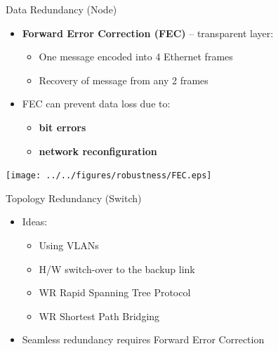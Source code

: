 \documentclass[compress,red]{beamer}
\begin{document}
\begin{frame}{Data Redundancy (Node)}
   
  \begin{itemize}
	\item {\bf Forward Error Correction (FEC)}  -- transparent layer:
	\begin{itemize}
		\item One message encoded into 4 Ethernet frames
		\item Recovery of message from any 2 frames
	\end{itemize}
	\item <2->FEC can prevent data loss due to:
	\begin{itemize}	
		\item<3-> {\bf bit errors} 
		\item<4> {\bf network reconfiguration}
	\end{itemize}	
  \end{itemize}
  
  	\begin{center}
      \texttt{[image: ../../figures/robustness/FEC.eps]}
    \end{center}
  
\end{frame}

\begin{frame}{Topology Redundancy (Switch)}

  \begin{itemize}
	\item Ideas:
	\begin{itemize}
        \item Using VLANs
        \item H/W switch-over to the backup link
	      \item WR Rapid Spanning Tree Protocol
	      \item WR Shortest Path Bridging
	\end{itemize}
	\item Seamless redundancy requires Forward Error Correction
  \end{itemize}
  
\end{frame}

\subsection{}
\end{document}
